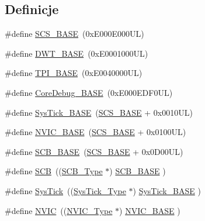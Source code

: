 \subsection*{Definicje}
\begin{DoxyCompactItemize}
\item 
\#define \hyperlink{group___c_m_s_i_s__core__base_ga3c14ed93192c8d9143322bbf77ebf770}{S\+C\+S\+\_\+\+B\+A\+SE}~(0x\+E000\+E000\+U\+L)
\item 
\#define \hyperlink{group___c_m_s_i_s__core__base_gafdab534f961bf8935eb456cb7700dcd2}{D\+W\+T\+\_\+\+B\+A\+SE}~(0x\+E0001000\+U\+L)
\item 
\#define \hyperlink{group___c_m_s_i_s__core__base_ga2b1eeff850a7e418844ca847145a1a68}{T\+P\+I\+\_\+\+B\+A\+SE}~(0x\+E0040000\+U\+L)
\item 
\#define \hyperlink{group___c_m_s_i_s__core__base_ga680604dbcda9e9b31a1639fcffe5230b}{Core\+Debug\+\_\+\+B\+A\+SE}~(0x\+E000\+E\+D\+F0\+U\+L)
\item 
\#define \hyperlink{group___c_m_s_i_s__core__base_ga58effaac0b93006b756d33209e814646}{Sys\+Tick\+\_\+\+B\+A\+SE}~(\hyperlink{group___c_m_s_i_s__core__base_ga3c14ed93192c8d9143322bbf77ebf770}{S\+C\+S\+\_\+\+B\+A\+SE} +  0x0010\+U\+L)
\item 
\#define \hyperlink{group___c_m_s_i_s__core__base_gaa0288691785a5f868238e0468b39523d}{N\+V\+I\+C\+\_\+\+B\+A\+SE}~(\hyperlink{group___c_m_s_i_s__core__base_ga3c14ed93192c8d9143322bbf77ebf770}{S\+C\+S\+\_\+\+B\+A\+SE} +  0x0100\+U\+L)
\item 
\#define \hyperlink{group___c_m_s_i_s__core__base_gad55a7ddb8d4b2398b0c1cfec76c0d9fd}{S\+C\+B\+\_\+\+B\+A\+SE}~(\hyperlink{group___c_m_s_i_s__core__base_ga3c14ed93192c8d9143322bbf77ebf770}{S\+C\+S\+\_\+\+B\+A\+SE} +  0x0\+D00\+U\+L)
\item 
\#define \hyperlink{group___c_m_s_i_s__core__base_gaaaf6477c2bde2f00f99e3c2fd1060b01}{S\+CB}~((\hyperlink{struct_s_c_b___type}{S\+C\+B\+\_\+\+Type}       $\ast$)     \hyperlink{group___c_m_s_i_s__core__base_gad55a7ddb8d4b2398b0c1cfec76c0d9fd}{S\+C\+B\+\_\+\+B\+A\+SE}         )
\item 
\#define \hyperlink{group___c_m_s_i_s__core__base_gacd96c53beeaff8f603fcda425eb295de}{Sys\+Tick}~((\hyperlink{struct_sys_tick___type}{Sys\+Tick\+\_\+\+Type}   $\ast$)     \hyperlink{group___c_m_s_i_s__core__base_ga58effaac0b93006b756d33209e814646}{Sys\+Tick\+\_\+\+B\+A\+SE}     )
\item 
\#define \hyperlink{group___c_m_s_i_s__core__base_gac8e97e8ce56ae9f57da1363a937f8a17}{N\+V\+IC}~((\hyperlink{struct_n_v_i_c___type}{N\+V\+I\+C\+\_\+\+Type}      $\ast$)     \hyperlink{group___c_m_s_i_s__core__base_gaa0288691785a5f868238e0468b39523d}{N\+V\+I\+C\+\_\+\+B\+A\+SE}        )

\end{DoxyCompactItemize}
